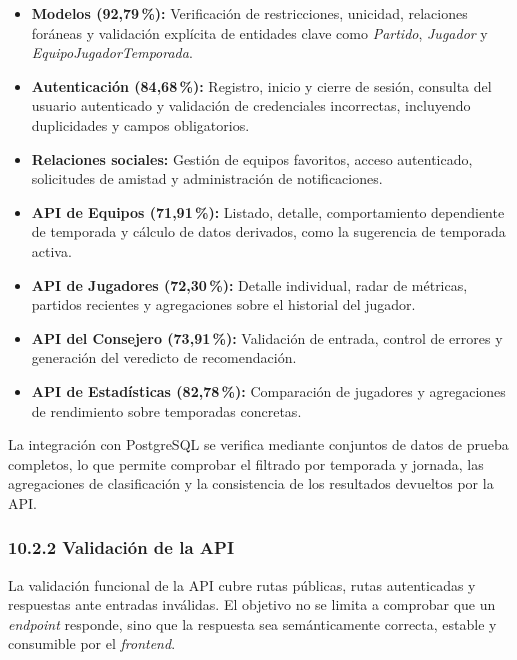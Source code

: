 \begin{itemize}
    \item \textbf{Modelos (92{,}79\,\%):} Verificación de restricciones, unicidad, relaciones foráneas y validación explícita de entidades clave como \textit{Partido}, \textit{Jugador} y \textit{EquipoJugadorTemporada}.

    \item \textbf{Autenticación (84{,}68\,\%):} Registro, inicio y cierre de sesión, consulta del usuario autenticado y validación de credenciales incorrectas, incluyendo duplicidades y campos obligatorios.

    \item \textbf{Relaciones sociales:} Gestión de equipos favoritos, acceso autenticado, solicitudes de amistad y administración de notificaciones.

    \item \textbf{API de Equipos (71{,}91\,\%):} Listado, detalle, comportamiento dependiente de temporada y cálculo de datos derivados, como la sugerencia de temporada activa.

    \item \textbf{API de Jugadores (72{,}30\,\%):} Detalle individual, radar de métricas, partidos recientes y agregaciones sobre el historial del jugador.

    \item \textbf{API del Consejero (73{,}91\,\%):} Validación de entrada, control de errores y generación del veredicto de recomendación.

    \item \textbf{API de Estadísticas (82{,}78\,\%):} Comparación de jugadores y agregaciones de rendimiento sobre temporadas concretas.
\end{itemize}

La integración con PostgreSQL se verifica mediante conjuntos de datos de prueba completos, lo que permite comprobar el filtrado por temporada y jornada, las agregaciones de clasificación y la consistencia de los resultados devueltos por la API.


\subsubsection{10.2.2 Validación de la API}
\label{subsec:validacion-api}

La validación funcional de la API cubre rutas públicas, rutas autenticadas y respuestas ante entradas inválidas. 
El objetivo no se limita a comprobar que un \textit{endpoint} responde, sino que la respuesta sea semánticamente
 correcta, estable y consumible por el \textit{frontend}.

